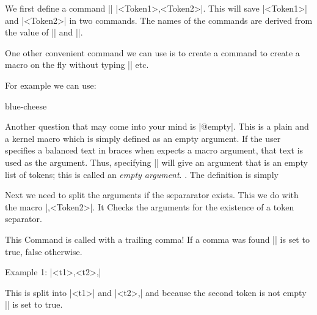 \noindent We first define a  command
|\GetTokens| |<Token1>,<Token2>|. 
This will save |<Token1>| and |<Token2>| in two commands. The names of the commands are derived from the value of |\SH@FirstArgName| and |\SH@SecondArgName|.

\begin{teX}
\def\GetTokens#1,#2\@empty{%
   \def\FirstArgument{#1}
}
\end{teX}


One other convenient command we can use is to create a command to create a macro on the fly without typing |\csname \endcsname| etc.

\begin{teX}
\def\DefineCommand#1#2{%
  \expandafter\def\csname #1\endcsname{#2}%
}
\end{teX}

For example we can use:

\begin{teX}
\say{\Cheesei}
\end{teX}


\def\DefineCommand#1#2{%
  \expandafter\def\csname #1\endcsname{#2}%
}
\DefineCommand{Cheesei}{blue-cheese}
\say{\Cheesei}

Another question that may come into your mind is |@empty|. This is a plain \tex and a \latex kernel macro which is simply defined as an empty argument.
If the user specifies a balanced text in braces when \tex expects a macro argument, that text is
used as the argument. Thus, specifying |{}| will give an argument that is an empty list of tokens;
this is called an \textit{empty argument}. . The definition is simply

\begin{teX}
\def\@empty{}
\end{teX}


\noindent Next we need to split the arguments if the separarator exists. This we do with the macro |,<Token2>|. It 
Checks the arguments for the existence of a token separator.

This Command is called with a trailing comma!
If a comma was found |\SH@TokenValid| is set to true, false otherwise.


Example 1: |<t1>,<t2>,|

This is split into |<t1>| and |<t2>,| and because the second token is
not empty |\SH@TokenValid| is set to true.

